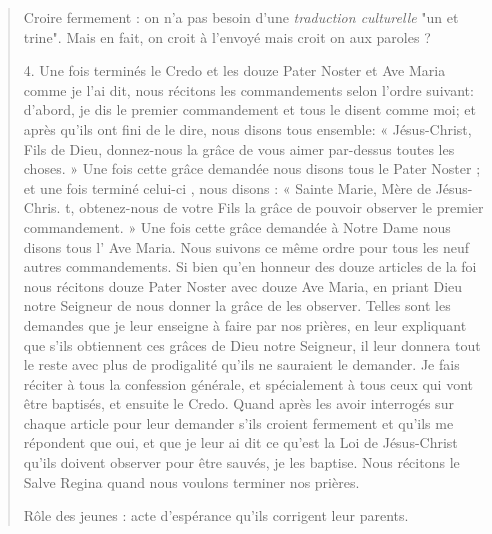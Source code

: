 \begin{quote}
\begin{Synthesis}
Croire fermement : on n'a pas besoin d'une \textit{traduction culturelle} "un et trine". Mais en fait, on croit à l'envoyé mais croit on aux paroles ? 

\end{Synthesis}

4. Une fois terminés le Credo et les douze Pater Noster et Ave
Maria comme je l'ai dit, nous récitons les commandements selon
l'ordre suivant: d'abord, je dis le premier commandement et tous
le disent comme moi; et après qu'ils ont fini de le dire, nous disons
tous ensemble: « Jésus-Christ, Fils de Dieu, donnez-nous la grâce
de vous aimer par-dessus toutes les choses. » Une fois cette grâce
demandée nous disons tous le Pater Noster ; et une fois terminé
celui-ci , nous disons : « Sainte Marie, Mère de Jésus-Chris. t,
obtenez-nous de votre Fils la grâce de pouvoir observer le premier
commandement. » Une fois cette grâce demandée à Notre Dame
nous disons tous l' Ave Maria. Nous suivons ce même ordre pour
tous les neuf autres commandements. Si bien qu'en honneur des
douze articles de la foi nous récitons douze Pater Noster avec douze
Ave Maria, en priant Dieu notre Seigneur de nous donner  la grâce de les observer. Telles sont les demandes que je leur enseigne
à faire par nos prières, en leur expliquant que s'ils obtiennent
ces grâces de Dieu notre Seigneur, il leur donnera tout le reste avec
plus de prodigalité qu'ils ne sauraient le demander. Je fais réciter
à tous la confession générale, et spécialement à tous ceux qui vont
être baptisés, et ensuite le Credo. Quand après les avoir interrogés
sur chaque article pour leur demander s'ils croient fermement
et qu'ils me répondent que oui, et que je leur ai dit ce qu'est la Loi
de Jésus-Christ qu'ils doivent observer pour être sauvés, je les baptise.
Nous récitons le Salve Regina quand nous voulons terminer
nos prières.

\begin{Synthesis}
Rôle des jeunes :  acte d'espérance qu'ils corrigent leur parents.
\end{Synthesis}


\end{quote}
